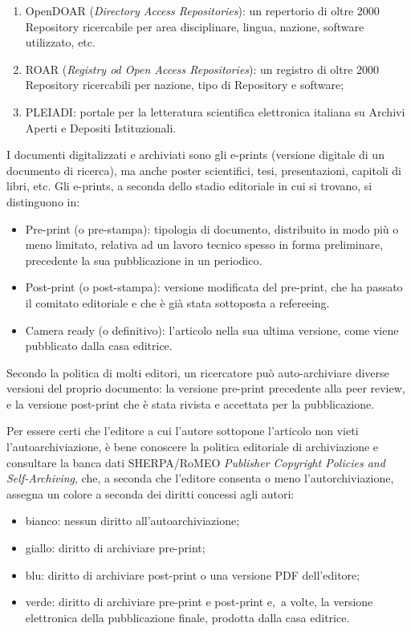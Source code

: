 \documentclass[
  b5paper,
  twoside,
  11pt,
  chapterprefix=false,
  bibliography=totocnumbered,
  parskip=0]{scrbook}
\begin{document}
\begin{enumerate}
\def\labelenumi{\arabic{enumi}.}
\item
  OpenDOAR (\emph{Directory Access Repositories}): un repertorio di oltre
  2000 Repository ricercabile per area disciplinare, lingua, nazione,
  software utilizzato, etc.
\item
  ROAR (\emph{Registry od Open Access Repositories}): un registro di oltre
  2000 Repository ricercabili per nazione, tipo di Repository e
  software;
\item
  PLEIADI: portale per la letteratura scientifica elettronica italiana
  su Archivi Aperti e Depositi Istituzionali.
\end{enumerate}

I documenti digitalizzati e archiviati sono gli e-prints (versione
digitale di un documento di ricerca), ma anche poster scientifici, tesi,
presentazioni, capitoli di libri, etc. Gli e-prints, a seconda dello
stadio editoriale in cui si trovano, si distinguono in:

\begin{itemize}
\item
  Pre-print (o pre-stampa): tipologia di documento, distribuito in
  modo più o meno limitato, relativa ad un lavoro tecnico spesso in
  forma preliminare, precedente la sua pubblicazione in un periodico.
\item
  Post-print (o post-stampa): versione modificata del pre-print, che
  ha passato il comitato editoriale e che è già stata sottoposta a
  refereeing.
\item
  Camera ready (o definitivo): l'articolo nella sua ultima versione,
  come viene pubblicato dalla casa editrice.
\end{itemize}

Secondo la politica di molti editori, un ricercatore può auto-archiviare
diverse versioni del proprio documento: la versione pre-print precedente
alla peer review, e la versione post-print che è stata rivista e
accettata per la pubblicazione.

Per essere certi che l'editore a cui l'autore sottopone l'articolo non
vieti l'autoarchiviazione, è bene conoscere la politica editoriale di
archiviazione e consultare la banca dati SHERPA/RoMEO \emph{Publisher
Copyright Policies and Self-Archiving}, che, a seconda che l'editore
consenta o meno l'autorchiviazione, assegna un colore a seconda dei
diritti concessi agli autori:

\begin{itemize}
\item
  bianco: nessun diritto all'autoarchiviazione;
\item
  giallo: diritto di archiviare pre-print;
\item
  blu: diritto di archiviare post-print o una versione PDF
  dell'editore;
\item
  verde: diritto di archiviare pre-print e post-print e,~a volte, la
  versione elettronica della pubblicazione finale, prodotta dalla casa
  editrice.
\end{itemize}
\end{document}
